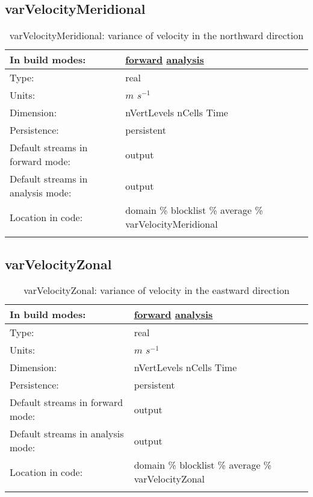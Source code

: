 \subsection[varVelocityMeridional]{varVelocityMeridional}
\label{subsec:var_sec_average_varVelocityMeridional}
\begin{center}
\begin{longtable}{| p{2.0in} | p{4.0in} |}
        \hline 
        In build modes: & \hyperref[subsec:forward_var_tab_average]{forward} \hyperref[subsec:analysis_var_tab_average]{analysis} \\
        \hline 
        Type: & real \\
        \hline 
        Units: & $m$ $s^{-1}$ \\
        \hline 
        Dimension: & nVertLevels nCells Time \\
        \hline 
        Persistence: & persistent \\
        \hline 
		 Default streams in forward mode: &  output \\
        \hline 
		 Default streams in analysis mode: &  output \\
        \hline 
		 Location in code: & domain \% blocklist \% average \% varVelocityMeridional \\
		 \hline 
    \caption{varVelocityMeridional: variance of velocity in the northward direction}
\end{longtable}
\end{center}
\subsection[varVelocityZonal]{varVelocityZonal}
\label{subsec:var_sec_average_varVelocityZonal}
\begin{center}
\begin{longtable}{| p{2.0in} | p{4.0in} |}
        \hline 
        In build modes: & \hyperref[subsec:forward_var_tab_average]{forward} \hyperref[subsec:analysis_var_tab_average]{analysis} \\
        \hline 
        Type: & real \\
        \hline 
        Units: & $m$ $s^{-1}$ \\
        \hline 
        Dimension: & nVertLevels nCells Time \\
        \hline 
        Persistence: & persistent \\
        \hline 
		 Default streams in forward mode: &  output \\
        \hline 
		 Default streams in analysis mode: &  output \\
        \hline 
		 Location in code: & domain \% blocklist \% average \% varVelocityZonal \\
		 \hline 
    \caption{varVelocityZonal: variance of velocity in the eastward direction}
\end{longtable}
\end{center}

